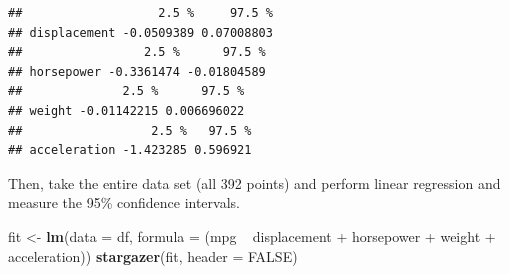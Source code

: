 \documentclass[]{article}
\newenvironment{Shaded}{\begin{snugshade}}{\end{snugshade}}
\newcommand{\KeywordTok}[1]{\textcolor[rgb]{0.13,0.29,0.53}{\textbf{{#1}}}}
\newcommand{\DataTypeTok}[1]{\textcolor[rgb]{0.13,0.29,0.53}{{#1}}}
\newcommand{\StringTok}[1]{\textcolor[rgb]{0.31,0.60,0.02}{{#1}}}
\newcommand{\OtherTok}[1]{\textcolor[rgb]{0.56,0.35,0.01}{{#1}}}
\newcommand{\NormalTok}[1]{{#1}}
\begin{document}
\begin{verbatim}
##                   2.5 %     97.5 %
## displacement -0.0509389 0.07008803
##                 2.5 %      97.5 %
## horsepower -0.3361474 -0.01804589
##              2.5 %      97.5 %
## weight -0.01142215 0.006696022
##                  2.5 %   97.5 %
## acceleration -1.423285 0.596921
\end{verbatim}

Then, take the entire data set (all 392 points) and perform linear
regression and measure the 95\% confidence intervals.

\begin{Shaded}
\begin{Highlighting}[]
\NormalTok{fit <-}\StringTok{ }\KeywordTok{lm}\NormalTok{(}\DataTypeTok{data =} \NormalTok{df, }\DataTypeTok{formula =} \NormalTok{(mpg ~}\StringTok{ }\NormalTok{displacement +}
\StringTok{                                  }\NormalTok{horsepower +}\StringTok{ }\NormalTok{weight +}\StringTok{ }\NormalTok{acceleration))}
\KeywordTok{stargazer}\NormalTok{(fit, }\DataTypeTok{header =} \OtherTok{FALSE}\NormalTok{)}
\end{Highlighting}
\end{Shaded}
\end{document}
